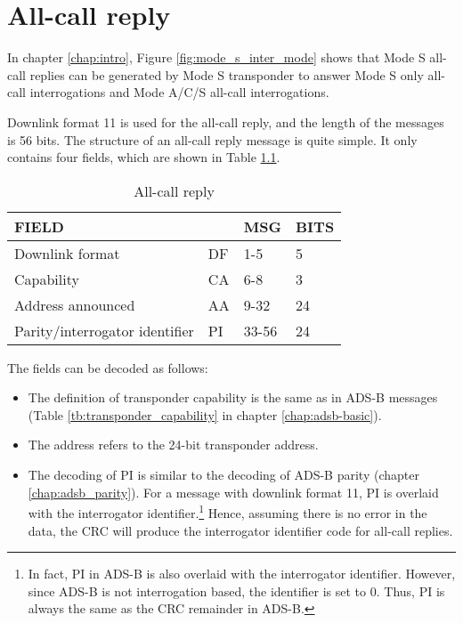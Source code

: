 \chapter{All-call reply}

In chapter \ref{chap:intro}, Figure \ref{fig:mode_s_inter_mode} shows that Mode S all-call replies can be generated by Mode S transponder to answer Mode S only all-call interrogations and Mode A/C/S all-call interrogations.

Downlink format 11 is used for the all-call reply, and the length of the messages is 56 bits. The structure of an all-call reply message is quite simple. It only contains four fields, which are shown in Table \ref{tb:df11_structure}.

\begin{table}[ht]
\caption{All-call reply}
\label{tb:df11_structure}
\begin{tabular}{|l|l|l|l|}
\hline
\textbf{FIELD} & \textbf{} & \textbf{MSG} & \textbf{BITS} \\ \hline
Downlink format & DF & 1-5 & 5 \\ \hline
Capability & CA & 6-8 & 3 \\ \hline
Address announced & AA & 9-32 & 24 \\ \hline
Parity/interrogator identifier & PI & 33-56 & 24 \\ \hline
\end{tabular}
\end{table}

The fields can be decoded as follows:

\begin{itemize}
  \item The definition of transponder capability is the same as in ADS-B messages (Table \ref{tb:transponder_capability} in chapter \ref{chap:adsb-basic}).

  \item The address refers to the 24-bit transponder address.

  \item The decoding of PI is similar to the decoding of ADS-B parity (chapter \ref{chap:adsb_parity}). For a message with downlink format 11, PI is overlaid with the interrogator identifier.\footnote{In fact, PI in ADS-B is also overlaid with the interrogator identifier. However, since ADS-B is not interrogation based, the identifier is set to 0. Thus, PI is always the same as the CRC remainder in ADS-B.} Hence, assuming there is no error in the data, the CRC will produce the interrogator identifier code for all-call replies.

\end{itemize}


